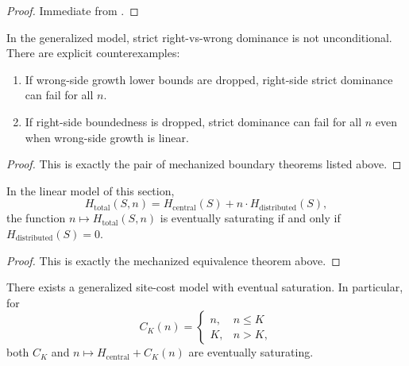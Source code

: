 \begin{proof}
Immediate from
.
\end{proof}

\begin{proposition}\label{prop:generalized-assumption-boundary}
In the generalized model, strict right-vs-wrong dominance is not unconditional. There are explicit counterexamples:
\begin{enumerate}
\item If wrong-side growth lower bounds are dropped, right-side strict dominance can fail for all $n$.
\item If right-side boundedness is dropped, strict dominance can fail for all $n$ even when wrong-side growth is linear.
\end{enumerate}
\end{proposition}

\begin{proof}
This is exactly the pair of mechanized boundary theorems listed above.
\end{proof}

\begin{theorem}\label{thm:linear-saturation-iff-zero}
In the linear model of this section,
\[
H_{\text{total}}(S,n)=H_{\text{central}}(S)+n\cdot H_{\text{distributed}}(S),
\]
the function $n\mapsto H_{\text{total}}(S,n)$ is eventually saturating if and only if $H_{\text{distributed}}(S)=0$.
\end{theorem}

\begin{proof}
This is exactly the mechanized equivalence theorem above.
\end{proof}

\begin{theorem}\label{thm:generalized-saturation-possible}
There exists a generalized site-cost model with eventual saturation. In particular, for
\[
C_K(n)=\begin{cases}
n, & n\le K\\
K, & n>K,
\end{cases}
\]
both $C_K$ and $n\mapsto H_{\text{central}}+C_K(n)$ are eventually saturating.
\end{theorem}

